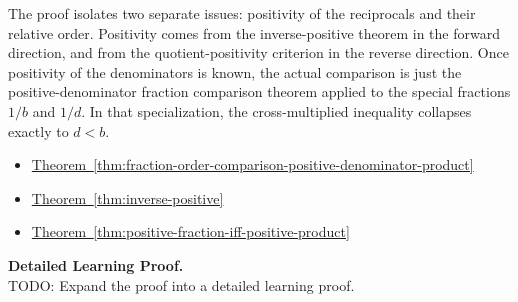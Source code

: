 \begin{remark*}
The proof isolates two separate issues: positivity of the reciprocals and
their relative order.  Positivity comes from the inverse-positive theorem in
the forward direction, and from the quotient-positivity criterion in the
reverse direction.  Once positivity of the denominators is known, the actual
comparison is just the positive-denominator fraction comparison theorem
applied to the special fractions $1/b$ and $1/d$.  In that specialization,
the cross-multiplied inequality collapses exactly to $d<b$.
\end{remark*}

\begin{dependencies}
\begin{itemize}
  \item \hyperref[thm:fraction-order-comparison-positive-denominator-product]{Theorem~\ref*{thm:fraction-order-comparison-positive-denominator-product}}
  \item \hyperref[thm:inverse-positive]{Theorem~\ref*{thm:inverse-positive}}
  \item \hyperref[thm:positive-fraction-iff-positive-product]{Theorem~\ref*{thm:positive-fraction-iff-positive-product}}
\end{itemize}
\end{dependencies}

\textbf{Detailed Learning Proof.}~\\
TODO: Expand the proof into a detailed learning proof.

